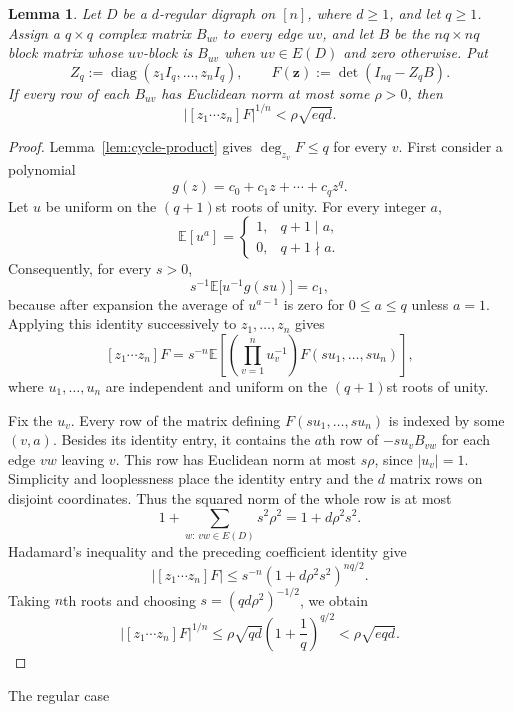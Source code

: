 \documentclass[11pt]{amsart}
\makeatletter
\def\section{\@startsection{section}{1}%
  \z@{1.5\linespacing\@plus.6\linespacing}{.65\linespacing}%
  {\normalfont\Large\bfseries\raggedright}}
\newtheorem{lemma}[theorem]{Lemma}
\theoremstyle{remark}
\newcommand{\diag}{\operatorname{diag}}
\makeatother
\begin{document}
\begin{lemma}\label{lem:hadamard-coefficient}
Let $D$ be a $d$-regular digraph on $[n]$, where $d\ge1$, and let
$q\ge1$.  Assign a $q\times q$ complex matrix $B_{uv}$ to every edge
$uv$, and let $B$ be the $nq\times nq$ block matrix whose $uv$-block is
$B_{uv}$ when $uv\in E(D)$ and zero otherwise.  Put
\[
  Z_q:=\diag(z_1I_q,\ldots,z_nI_q),
  \qquad F(\mathbf z):=\det(I_{nq}-Z_qB).
\]
If every row of each $B_{uv}$ has Euclidean norm at most some $\rho>0$,
then
\[
  \left|[z_1\cdots z_n]F\right|^{1/n}
  <\rho\sqrt{eqd}.
\]
\end{lemma}

\begin{proof}
Lemma~\ref{lem:cycle-product} gives $\deg_{z_v}F\le q$ for every $v$.
First consider a polynomial
\[
  g(z)=c_0+c_1z+\cdots+c_qz^q.
\]
Let $u$ be uniform on the $(q+1)$st roots of unity.  For every integer
$a$,
\[
  \mathbb E[u^a]
  =
  \begin{cases}
    1,&q+1\mid a,\\
    0,&q+1\nmid a.
  \end{cases}
\]
Consequently, for every $s>0$,
\[
  s^{-1}\mathbb E\bigl[u^{-1}g(su)\bigr]=c_1,
\]
because after expansion the average of $u^{a-1}$ is zero for
$0\le a\le q$ unless $a=1$.  Applying this identity successively to
$z_1,\ldots,z_n$ gives
\[
  [z_1\cdots z_n]F
  =
  s^{-n}\mathbb E\left[
    \left(\prod_{v=1}^n u_v^{-1}\right)
    F(su_1,\ldots,su_n)
  \right],
\]
where $u_1,\ldots,u_n$ are independent and uniform on the
$(q+1)$st roots of unity.

Fix the $u_v$.  Every row of the matrix defining
$F(su_1,\ldots,su_n)$ is indexed by some $(v,a)$.  Besides its identity
entry, it contains the $a$th row of $-su_vB_{vw}$ for each edge $vw$
leaving $v$.  This row has Euclidean norm at most $s\rho$, since
$|u_v|=1$.  Simplicity and looplessness place the identity entry and
the $d$ matrix rows on disjoint coordinates.  Thus the squared norm of
the whole row is at most
\[
  1+\sum_{w:\,vw\in E(D)}s^2\rho^2=1+d\rho^2s^2.
\]
Hadamard's inequality and the preceding coefficient identity give
\[
  \left|[z_1\cdots z_n]F\right|
  \le
  s^{-n}(1+d\rho^2s^2)^{nq/2}.
\]
Taking $n$th roots and choosing $s=(qd\rho^2)^{-1/2}$, we obtain
\[
  \left|[z_1\cdots z_n]F\right|^{1/n}
  \le
  \rho\sqrt{qd}\left(1+\frac1q\right)^{q/2}
  <\rho\sqrt{eqd}.
\]
\end{proof}

\section{The regular case}
\end{document}
